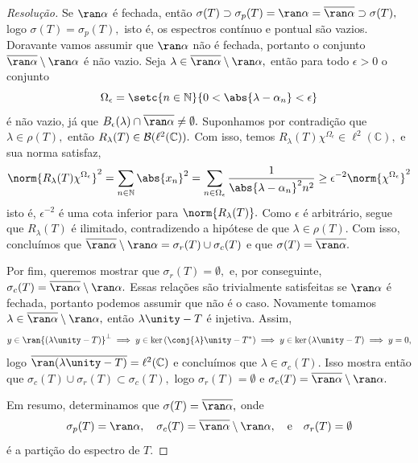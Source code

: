 \begin{proof}[Resolução]
  Se \(\ran\alpha\) é fechada, então \(\sigma(T) \supset \sigma_p(T) = \ran \alpha = \closure{\ran\alpha} \supset \sigma(T),\) logo \(\sigma(T) = \sigma_p(T),\) isto é, os espectros contínuo e pontual são vazios. Doravante vamos assumir que \(\ran\alpha\) não é fechada, portanto o conjunto \(\closure{\ran\alpha}\setminus \ran \alpha\) é não vazio. Seja \(\lambda \in \closure{\ran\alpha}\setminus\ran\alpha,\) então para todo \(\epsilon > 0\) o conjunto
  \begin{equation*}
    \Omega_\epsilon = \setc{n \in \mathbb{N}}{0 < \abs{\lambda - \alpha_n} < \epsilon}
  \end{equation*}
  é não vazio, já que \(B_\epsilon(\lambda)\cap \closure{\ran\alpha} \neq \emptyset.\) Suponhamos por contradição que \(\lambda \in \rho(T),\) então \(R_\lambda(T) \in \mathcal{B}(\ell^2(\mathbb{C})).\) Com isso, temos \(R_\lambda(T)\chi^{\Omega_\epsilon} \in \ell^2(\mathbb{C}),\) e sua norma satisfaz,
  \begin{equation*}
    \norm{R_\lambda(T)\chi^{\Omega_\epsilon}}^2 = \sum_{n \in \mathbb{N}}{\abs{x_n}^2} = \sum_{n \in \Omega_\epsilon}{\frac{1}{\abs{\lambda - \alpha_n}^2n^2}} \geq \epsilon^{-2} \norm{\chi^{\Omega_\epsilon}}^2
  \end{equation*}
  isto é, \(\epsilon^{-2}\) é uma cota inferior para \(\norm{R_\lambda(T)}.\) Como \(\epsilon\) é arbitrário, segue que \(R_\lambda(T)\) é ilimitado, contradizendo a hipótese de que \(\lambda \in \rho(T).\) Com isso, concluímos que  \(\closure{\ran \alpha} \setminus \ran\alpha = \sigma_r(T) \cup \sigma_c(T)\) e que \(\sigma(T) = \closure{\ran\alpha}.\)

  Por fim, queremos mostrar que \(\sigma_r(T) = \emptyset,\) e, por conseguinte, \(\sigma_c(T) = \closure{\ran\alpha} \setminus \ran\alpha.\) Essas relações são trivialmente satisfeitas se \(\ran\alpha\) é fechada, portanto podemos assumir que não é o caso. Novamente tomamos \(\lambda \in \closure{\ran\alpha} \setminus \ran\alpha,\) então \(\lambda \unity - T\) é injetiva. Assim,
  \begin{equation*}
    y \in \ran{(\lambda \unity - T)}^\perp \implies y \in \ker{(\conj{\lambda} \unity - T^*)} \implies y \in \ker{(\lambda \unity - T)} \implies y = 0,
  \end{equation*}
  logo \(\closure{\ran(\lambda \unity - T)} = \ell^2(\mathbb{C})\) e concluímos que \(\lambda \in \sigma_c(T).\) Isso mostra então que \(\sigma_c(T) \cup \sigma_r(T) \subset \sigma_c(T),\) logo \(\sigma_r(T) = \emptyset\) e \(\sigma_c(T) = \closure{\ran\alpha}\setminus\ran\alpha.\)

  Em resumo, determinamos que \(\sigma(T) = \closure{\ran\alpha},\) onde
  \begin{equation*}
      \sigma_p(T) = \ran\alpha,\quad
      \sigma_c(T) = \closure{\ran\alpha} \setminus \ran\alpha,\quad\text{e}\quad
      \sigma_r(T) = \emptyset
  \end{equation*}
  é a partição do espectro de \(T.\)
\end{proof}
